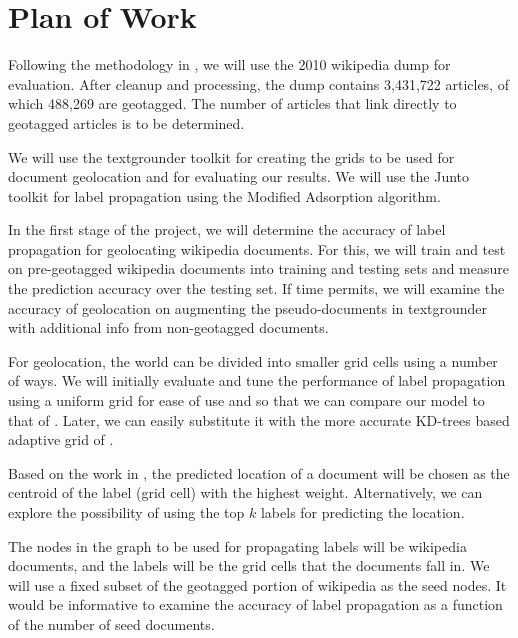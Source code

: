 \documentclass[11pt]{article}
\begin{document}


\section{Plan of Work}
Following the methodology in \cite{wing-baldridge:11}, we will use the 2010 wikipedia dump for evaluation. 
After cleanup and processing, the dump contains 3,431,722  articles, of which 488,269 are geotagged. 
The number of articles that link directly to geotagged articles is to be determined.

We will use the textgrounder \cite{textgrounder} toolkit for creating the grids to be used for document geolocation and for evaluating our results. 
We will use the Junto toolkit \cite{junto} for label propagation using the Modified Adsorption algorithm.

In the first stage of the project, we will determine the accuracy of label propagation for
geolocating wikipedia documents. For this, we will train and test on pre-geotagged wikipedia documents
into training and testing sets and measure the prediction accuracy over the testing set.
If time permits, we will examine the accuracy of geolocation on augmenting the pseudo-documents
in textgrounder with additional info from non-geotagged documents.


For geolocation, the world can be divided into smaller grid cells using a number of ways. We will initially evaluate and tune the performance of label propagation
using a uniform grid for ease of use and so that we can compare our model to that of \cite{wing-baldridge:11}. Later, we can easily substitute it with 
the more accurate KD-trees based adaptive grid of \cite{rolleretal:12}.

Based on the work in \cite{rolleretal:12}, the predicted location of a document will be chosen as the 
centroid of the label (grid cell) with the highest weight. Alternatively, we can explore the possibility of
using the top $k$ labels for predicting the location.

The nodes in the graph to be used for propagating labels will be wikipedia documents, and the labels will be the grid cells that the documents fall in.
We will use a fixed subset of the geotagged portion of wikipedia as the seed nodes. It would be informative to examine the accuracy of label propagation
as a function of the number of seed documents. 
\end{document}
